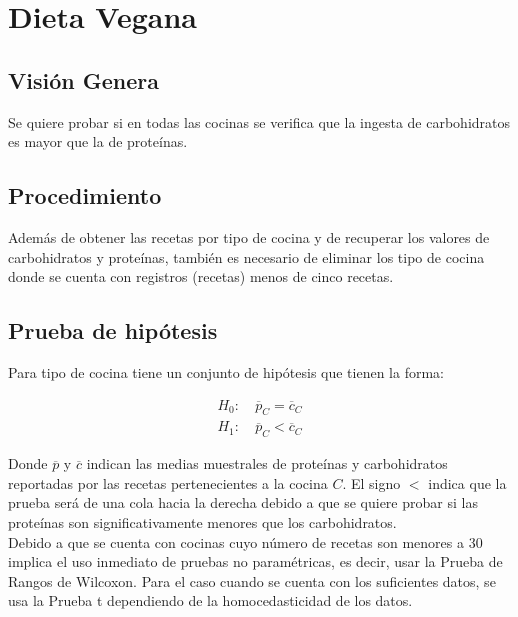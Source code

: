 \documentclass[12pt,a4paper]{article}
\begin{document}
    \section{Dieta Vegana}
    {
        \subsection{Visión Genera}
        {
            Se quiere probar si en todas las cocinas se verifica que la ingesta de 
            carbohidratos es mayor que la de proteínas.
        }

        \subsection{Procedimiento}
        {
            Además de obtener las recetas por tipo de cocina y de recuperar los 
            valores de carbohidratos y proteínas, también es necesario de eliminar 
            los tipo de cocina donde se cuenta con registros (recetas) menos de 
            cinco recetas.
        }

        \subsection{Prueba de hipótesis}
        {
            Para tipo de cocina tiene un conjunto de hipótesis que tienen la forma:

            \begin{align*}
                H_0 :&\ \overline{p}_{C} = \overline{c}_{C} \\ 
                H_1 :&\ \overline{p}_{C} < \overline{c}_{C}
            \end{align*}

            Donde $\overline{p}$ y $\overline{c}$ indican las medias muestrales de proteínas y carbohidratos
            reportadas por las recetas pertenecientes a la cocina $C$. El signo 
            $<$ indica que la prueba será de una cola hacia la derecha debido a 
            que se quiere probar si las proteínas son significativamente menores 
            que los carbohidratos.\\

            Debido a que se cuenta con cocinas cuyo número de recetas son menores a 
            $30$ implica el uso inmediato de pruebas no paramétricas, es decir, usar 
            la Prueba de Rangos de Wilcoxon. Para el caso cuando se cuenta con los 
            suficientes datos, se usa la Prueba t dependiendo de la homocedasticidad  
            de los datos.
        }
    }
\end{document}
